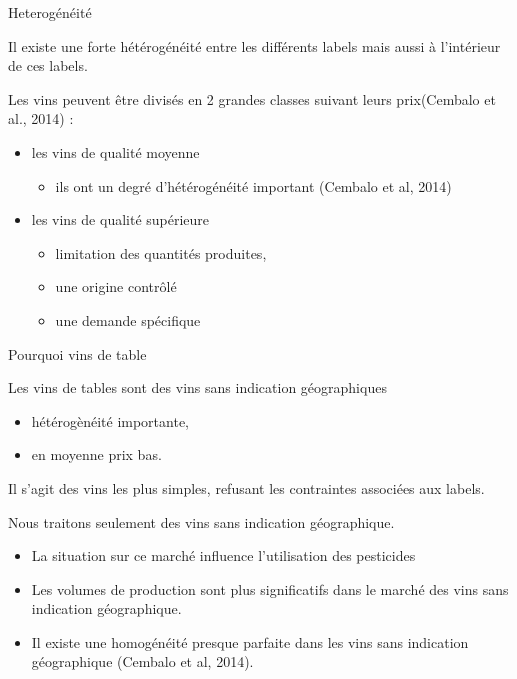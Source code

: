 \documentclass[11pt,ignorenonframetext,]{beamer}
\providecommand{\tightlist}{%
  \setlength{\itemsep}{0pt}\setlength{\parskip}{0pt}}
\begin{document}
\begin{frame}{Heterogénéité}
\protect\hypertarget{heterogeneite}{}

Il existe une forte hétérogénéité entre les différents labels mais aussi
à l'intérieur de ces labels.

Les vins peuvent être divisés en 2 grandes classes suivant leurs
prix(Cembalo et al., 2014) :

\begin{itemize}
\tightlist
\item
  les vins de qualité moyenne

  \begin{itemize}
  \tightlist
  \item
    ils ont un degré d'hétérogénéité important (Cembalo et al, 2014)
  \end{itemize}
\item
  les vins de qualité supérieure

  \begin{itemize}
  \tightlist
  \item
    limitation des quantités produites,
  \item
    une origine contrôlé
  \item
    une demande spécifique
  \end{itemize}
\end{itemize}

\end{frame}

\begin{frame}{Pourquoi vins de table}
\protect\hypertarget{pourquoi-vins-de-table}{}

Les vins de tables sont des vins sans indication géographiques

\begin{itemize}
\tightlist
\item
  hétérogènéité importante,
\item
  en moyenne prix bas.
\end{itemize}

Il s'agit des vins les plus simples, refusant les contraintes associées
aux labels.

Nous traitons seulement des vins sans indication géographique.

\begin{itemize}
\tightlist
\item
  La situation sur ce marché influence l'utilisation des pesticides
\item
  Les volumes de production sont plus significatifs dans le marché des
  vins sans indication géographique.
\item
  Il existe une homogénéité presque parfaite dans les vins sans
  indication géographique (Cembalo et al, 2014).
\end{itemize}

\end{frame}
\end{document}
